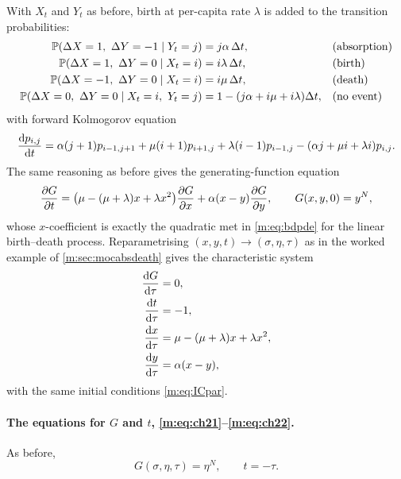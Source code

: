 With $X_t$ and $Y_t$ as before, birth at per-capita rate $\lambda$ is added to
the transition probabilities:
\begin{align*}
\mathbb{P}\!\left(\Delta X = 1,\ \Delta Y = -1 \mid Y_t=j\right) &= j\alpha\,\Delta t, &&\text{(absorption)}\\
\mathbb{P}\!\left(\Delta X = 1,\ \Delta Y = 0 \mid X_t=i\right) &= i\lambda\,\Delta t, &&\text{(birth)}\\
\mathbb{P}\!\left(\Delta X = -1,\ \Delta Y = 0 \mid X_t=i\right) &= i\mu\,\Delta t, &&\text{(death)}\\
\mathbb{P}\!\left(\Delta X = 0,\ \Delta Y = 0 \mid X_t=i,\ Y_t=j\right) &= 1-(j\alpha+i\mu+i\lambda)\Delta t, &&\text{(no event)}
\end{align*}
with forward Kolmogorov equation
\begin{equation}
\label{m:eq:FK3}
\frac{\mathrm{d} p_{i,j}}{\mathrm{d} t} = \alpha(j+1)p_{i-1,j+1} + \mu(i+1)p_{i+1,j} + \lambda(i-1)p_{i-1,j}
- (\alpha j+\mu i+\lambda i)p_{i,j} .
\end{equation}
The same reasoning as before gives the generating-function equation
\begin{equation}
\label{m:eq:PDE3}
\frac{\partial G}{\partial t} = \bigl(\mu-(\mu+\lambda)x+\lambda x^2\bigr)\frac{\partial G}{\partial x} + \alpha(x-y)\frac{\partial G}{\partial y},
\qquad G(x,y,0)=y^N ,
\end{equation}
whose $x$-coefficient is exactly the quadratic met in \cref{m:eq:bdpde} for the
linear birth--death process. Reparametrising $(x,y,t)\to(\sigma,\eta,\tau)$ as
in the worked example of \cref{m:sec:mocabsdeath} gives the characteristic
system
\begin{align}
\frac{\mathrm{d} G}{\mathrm{d} \tau} &= 0, \label{m:eq:ch21}\\
\frac{\mathrm{d} t}{\mathrm{d} \tau} &= -1, \label{m:eq:ch22}\\
\frac{\mathrm{d} x}{\mathrm{d} \tau} &= \mu-(\mu+\lambda)x+\lambda x^2, \label{m:eq:ch23}\\
\frac{\mathrm{d} y}{\mathrm{d} \tau} &= \alpha(x-y), \label{m:eq:ch24}
\end{align}
with the same initial conditions \cref{m:eq:ICpar}.

\paragraph{The equations for $G$ and $t$, \eqref{m:eq:ch21}--\eqref{m:eq:ch22}.}
As before,
\begin{equation}
\label{m:eq:GetaN2}
G(\sigma,\eta,\tau) = \eta^N,
\qquad
t = -\tau .
\end{equation}

